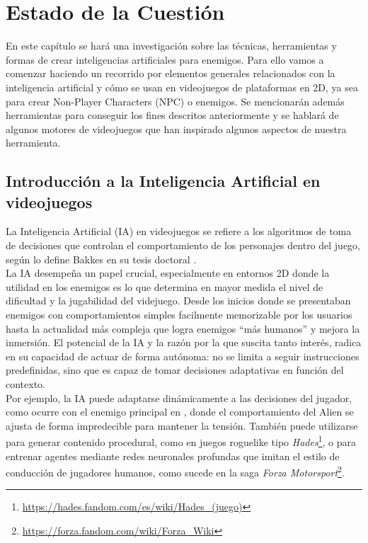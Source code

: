 \chapter{Estado de la Cuestión}
\label{cap:estadoDeLaCuestion}


En este capítulo se hará una investigación sobre las técnicas, herramientas y formas de crear inteligencias artificiales para enemigos.
Para ello vamos a comenzar haciendo un recorrido por elementos generales relacionados con la inteligencia artificial y cómo se usan en videojuegos de plataformas en 2D, ya sea para crear Non-Player Characters (NPC) o enemigos.
Se mencionarán además herramientas para conseguir los fines descritos anteriormente y se hablará de algunos motores de videojuegos que han inspirado algunos aspectos de nuestra herramienta. \\


\section{Introducción a la Inteligencia Artificial en videojuegos}

La Inteligencia Artificial (IA) en videojuegos se refiere a los algoritmos de toma de decisiones que controlan el comportamiento de los personajes dentro del juego, según lo define Bakkes en su tesis doctoral \cite{Bakkes2010}.\\

La IA desempeña un papel crucial, especialmente en entornos 2D donde la utilidad en los enemigos es lo que determina en mayor medida el nivel de dificultad y la jugabilidad del videjuego. Desde los inicios donde se  presentaban enemigos con comportamientos simples facilmente memorizable por los usuarios hasta la actualidad más compleja que logra enemigos “más humanos” y mejora la inmersión. El potencial de la IA y la razón por la que suscita tanto interés, radica en su capacidad de actuar de forma autónoma: no se limita a seguir instrucciones predefinidas, sino que es capaz de tomar decisiones adaptativas en función del contexto.\\

Por ejemplo, la IA puede adaptarse dinámicamente a las decisiones del jugador, como ocurre con el enemigo principal en  \cite{Hope2014}, donde el comportamiento del Alien se ajusta de forma impredecible para mantener la tensión. También puede utilizarse para generar contenido procedural, como en juegos roguelike tipo \textit{Hades}\footnote{\url{https://hades.fandom.com/es/wiki/Hades_(juego)}}, o para entrenar agentes mediante redes neuronales profundas que imitan el estilo de conducción de jugadores humanos, como sucede en la saga \textit{Forza Motorsport}\footnote{\url{https://forza.fandom.com/wiki/Forza_Wiki}}.\\

